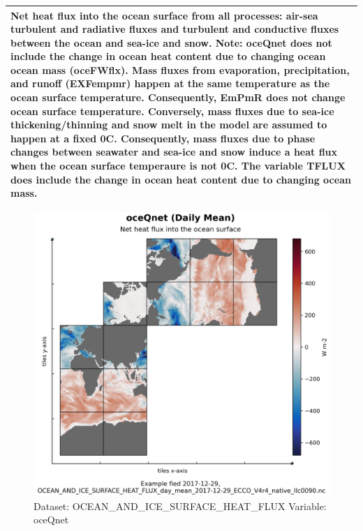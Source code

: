 \begin{longtable}{|p{}|p{}|p{}|p{}|}
\multicolumn{4}{|p{1\textwidth}|}{Net heat flux into the ocean surface from all processes: air-sea turbulent and radiative fluxes and turbulent and conductive fluxes between the ocean and sea-ice and snow. Note: oceQnet does not include the change in ocean heat content due to changing ocean ocean mass (oceFWflx). Mass fluxes from evaporation, precipitation, and runoff (EXFempmr) happen at the same temperature as the ocean surface temperature. Consequently, EmPmR does not change ocean surface temperature. Conversely, mass fluxes due to sea-ice thickening/thinning and snow melt in the model are assumed to happen at a fixed 0C. Consequently, mass fluxes due to phase changes between seawater and sea-ice and snow induce a heat flux when the ocean surface temperaure is not 0C. The variable TFLUX does include the change in ocean heat content due to changing ocean mass.} \\ \hline
\end{longtable}

\begin{figure}[H]
\centering
\includegraphics[width=\textwidth]{../images/plots/native_plots/Ocean_and_Sea-Ice_Surface_Heat_Fluxes/oceQnet.png}
\caption{Dataset: OCEAN\_AND\_ICE\_SURFACE\_HEAT\_FLUX Variable: oceQnet}
\label{tab:table-OCEAN_AND_ICE_SURFACE_HEAT_FLUX_oceQnet-Plot}
\end{figure}
\pagebreak
